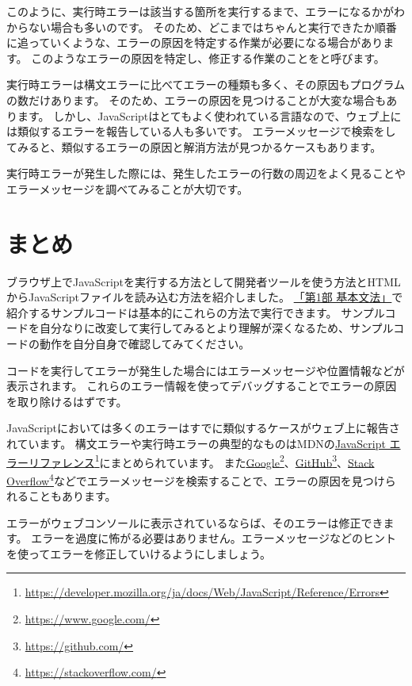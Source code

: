 このように、実行時エラーは該当する箇所を実行するまで、エラーになるかがわからない場合も多いのです。
そのため、どこまではちゃんと実行できたか順番に追っていくような、エラーの原因を特定する作業が必要になる場合があります。
このようなエラーの原因を特定し、修正する作業のことを\textbf{}と呼びます。

実行時エラーは構文エラーに比べてエラーの種類も多く、その原因もプログラムの数だけあります。
そのため、エラーの原因を見つけることが大変な場合もあります。
しかし、JavaScriptはとてもよく使われている言語なので、ウェブ上には類似するエラーを報告している人も多いです。
エラーメッセージで検索をしてみると、類似するエラーの原因と解消方法が見つかるケースもあります。

実行時エラーが発生した際には、発生したエラーの行数の周辺をよく見ることやエラーメッセージを調べてみることが大切です。

\hypertarget{conclusion}{%
\section{まとめ}\label{conclusion}}

ブラウザ上でJavaScriptを実行する方法として開発者ツールを使う方法とHTMLからJavaScriptファイルを読み込む方法を紹介しました。
\hyperlink{basic-grammar}{「第1部 基本文法」}で紹介するサンプルコードは基本的にこれらの方法で実行できます。
サンプルコードを自分なりに改変して実行してみるとより理解が深くなるため、サンプルコードの動作を自分自身で確認してみてください。

コードを実行してエラーが発生した場合にはエラーメッセージや位置情報などが表示されます。
これらのエラー情報を使ってデバッグすることでエラーの原因を取り除けるはずです。

JavaScriptにおいては多くのエラーはすでに類似するケースがウェブ上に報告されています。
構文エラーや実行時エラーの典型的なものはMDNの\href{https://developer.mozilla.org/ja/docs/Web/JavaScript/Reference/Errors}{JavaScript
エラーリファレンス}\footnote{\url{https://developer.mozilla.org/ja/docs/Web/JavaScript/Reference/Errors}}にまとめられています。
また\href{https://www.google.com/}{Google}\footnote{\url{https://www.google.com/}}、\href{https://github.com/}{GitHub}\footnote{\url{https://github.com/}}、\href{https://stackoverflow.com/}{Stack
Overflow}\footnote{\url{https://stackoverflow.com/}}などでエラーメッセージを検索することで、エラーの原因を見つけられることもあります。

エラーがウェブコンソールに表示されているならば、そのエラーは修正できます。
エラーを過度に怖がる必要はありません。エラーメッセージなどのヒントを使ってエラーを修正していけるようにしましょう。

